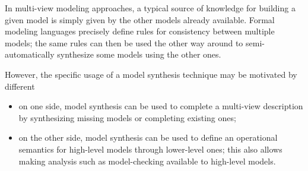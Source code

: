 In multi-view modeling approaches, a typical source of knowledge for building a given model is simply given by the other models already available. Formal modeling languages precisely define rules for consistency between multiple models; the same rules can then be used the other way around to semi-automatically synthesize some models using the other ones. 

However, the specific usage of a model synthesis technique may be motivated by different 

\begin{itemize}
\item on one side, model synthesis can be used to complete a multi-view description by synthesizing missing models or completing existing ones;
\item on the other side, model synthesis can be used to define an operational semantics for high-level models through lower-level ones; this also allows making analysis such as model-checking available to high-level models.
\end{itemize}
